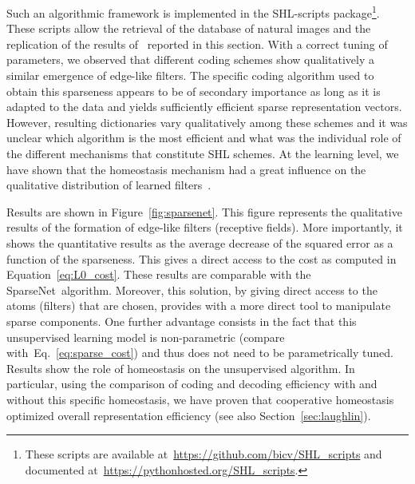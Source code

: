 \documentclass[a4paper, 11pt]{book}
\newcommand{\sparsenet}{{\sc SparseNet}}%
\newcommand{\seeEq}[1]{Eq.~\ref{eq:#1}}%
\begin{document}
Such an algorithmic framework is implemented in the SHL-scripts package\footnote{These scripts are available at~\url{https://github.com/bicv/SHL_scripts} and documented at~\url{https://pythonhosted.org/SHL_scripts}.}.
These scripts allow the retrieval of the database of natural images and the replication of the results of~\citep{Perrinet10shl} reported in this section. With a correct tuning of parameters, we observed that different coding schemes show qualitatively a similar emergence of edge-like filters. The specific coding algorithm used to obtain this sparseness appears to be of secondary importance as long as it is adapted to the data and yields sufficiently efficient sparse representation vectors. However, resulting dictionaries vary qualitatively among these schemes and it was unclear which algorithm is the most efficient and what was the individual role of the different mechanisms that constitute SHL schemes. At the learning level, we have shown that the homeostasis mechanism had a great influence on the qualitative distribution of learned filters~\citep{Perrinet10shl}.

Results are shown in Figure~\ref{fig:sparsenet}.
This figure represents the qualitative results of the formation of edge-like filters (receptive fields).
More importantly, it shows the quantitative results as the average decrease of the squared error as a function of the sparseness.
This gives a direct access to the cost as computed in Equation~\ref{eq:L0_cost}.
These results are comparable with the \sparsenet\ algorithm.
Moreover, this solution,
by giving direct access to the atoms (filters) that are chosen,
provides with a more direct tool to manipulate sparse components.
One further advantage consists in the fact that this unsupervised learning model is non-parametric (compare with~\seeEq{sparse_cost})
and thus does not need to be parametrically tuned.
Results show the role of homeostasis on the unsupervised algorithm.
In particular, using the comparison of coding and decoding efficiency with and without this specific homeostasis,
we have proven that cooperative homeostasis optimized overall representation efficiency (see also Section~\ref{sec:laughlin}).
\end{document}
